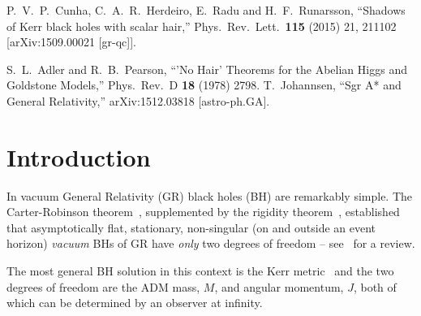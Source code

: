 \begin{small}
\begin{thebibliography}{99}
  P.~V.~P.~Cunha, C.~A.~R.~Herdeiro, E.~Radu and H.~F.~Runarsson,
  ``Shadows of Kerr black holes with scalar hair,''
  Phys.\ Rev.\ Lett.\  {\bf 115} (2015) 21,  211102
  [arXiv:1509.00021 [gr-qc]].




  S.~L.~Adler and R.~B.~Pearson,
  ``'No Hair' Theorems for the Abelian Higgs and Goldstone Models,''
  Phys.\ Rev.\ D {\bf 18} (1978) 2798.
  T.~Johannsen,
  ``Sgr A* and General Relativity,''
  arXiv:1512.03818 [astro-ph.GA].


\end{thebibliography}

 \end{small}




 
\section{Introduction}
 
In vacuum General Relativity (GR) black holes (BH) are remarkably simple. The Carter-Robinson theorem~\cite{Carter:1971zc,Robinson:1975bv}, supplemented by the rigidity theorem~\cite{Hawking:1971vc,Racz:1995nh}, established that asymptotically flat, stationary, non-singular (on and outside an event horizon)  \textit{vacuum} BHs of GR have \textit{only} 
two degrees of freedom -- see~\cite{Chrusciel:2012jk} for a review.  

The most general BH solution in this context is the Kerr metric~\cite{Kerr:1963ud} and the two degrees of freedom are the ADM mass, $M$, and angular momentum, $J$, both of which can be determined by an observer at infinity. 

